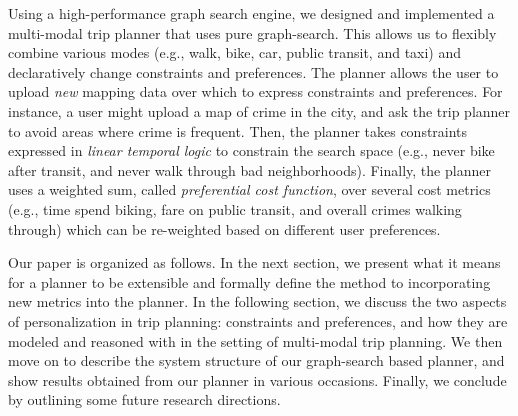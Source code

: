\documentclass[letterpaper]{article}
\newcommand{\tit}[1]{\textit{#1}}
\begin{document}
Using a high-performance graph search
engine\cite{zhou2011dynamic}, we designed and implemented a 
multi-modal trip planner that uses pure
graph-search. This allows us to flexibly combine various modes
(e.g., walk, bike, car, public transit, and taxi) and 
declaratively change constraints and preferences. 
The planner allows the user
to upload \tit{new} mapping data over which to express
constraints and preferences.  For instance, a user might upload a map of crime
in the city, and ask the trip planner to avoid areas where crime is frequent.
Then, the planner takes constraints expressed in \tit{linear
temporal logic} to constrain the search space (e.g., never bike after
transit, and never walk through bad neighborhoods).
Finally, the planner uses a weighted sum, called \tit{preferential cost function}, 
over several cost metrics (e.g., time spend biking, fare on public transit, 
and overall crimes walking through) which can be re-weighted based
on different user preferences. 

Our paper is organized as follows.
In the next section, we present what it means for a planner to be extensible
and formally define the method to incorporating new metrics into the planner.
In the following section, we discuss the two aspects of personalization
in trip planning: constraints and preferences, and how they are modeled and
reasoned with in the setting of multi-modal trip planning.
We then move on to describe the system structure of our graph-search based planner,
and show results obtained from our planner in various occasions.
Finally, we conclude by outlining some future research directions.
\end{document}
